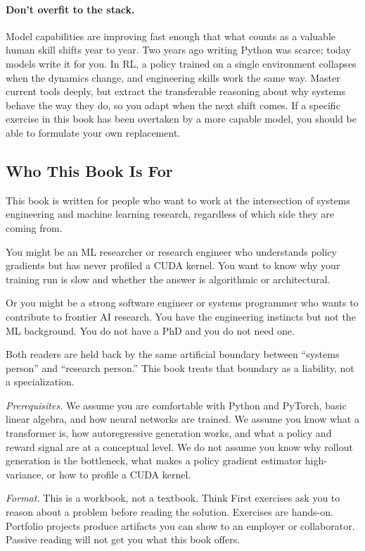 \paragraph{Don't overfit to the stack.}
Model capabilities are improving fast enough that what counts as a valuable human skill shifts year to year. Two years ago writing Python was scarce; today models write it for you. In RL, a policy trained on a single environment collapses when the dynamics change, and engineering skills work the same way. Master current tools deeply, but extract the transferable reasoning about why systems behave the way they do, so you adapt when the next shift comes. If a specific exercise in this book has been overtaken by a more capable model, you should be able to formulate your own replacement.

\subsection*{Who This Book Is For}

This book is written for people who want to work at the intersection of systems engineering and machine learning research, regardless of which side they are coming from.

You might be an ML researcher or research engineer who understands policy gradients but has never profiled a CUDA kernel. You want to know why your training run is slow and whether the answer is algorithmic or architectural.

Or you might be a strong software engineer or systems programmer who wants to contribute to frontier AI research. You have the engineering instincts but not the ML background. You do not have a PhD and you do not need one.

Both readers are held back by the same artificial boundary between ``systems person'' and ``research person.'' This book treats that boundary as a liability, not a specialization.

\textit{Prerequisites.} We assume you are comfortable with Python and PyTorch, basic linear algebra, and how neural networks are trained. We assume you know what a transformer is, how autoregressive generation works, and what a policy and reward signal are at a conceptual level. We do not assume you know why rollout generation is the bottleneck, what makes a policy gradient estimator high-variance, or how to profile a CUDA kernel.

\textit{Format.} This is a workbook, not a textbook. Think First exercises ask you to reason about a problem before reading the solution. Exercises are hands-on. Portfolio projects produce artifacts you can show to an employer or collaborator. Passive reading will not get you what this book offers.

